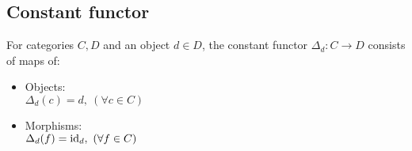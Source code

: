 \subsection{Constant functor}
For categories $C,D$ and an object $d\in D$, the constant functor $\Delta_d:
C\to D$ consists of maps of: \parencite{awodey:category_theory}
\begin{itemize}
  \item Objects:\\
    $\Delta_d(c) = d,\ (\forall c\in C)$
  \item Morphisms:\\
    $\Delta_d(f) = \mathrm{id}_d,\ (\forall f\in C)$
\end{itemize}